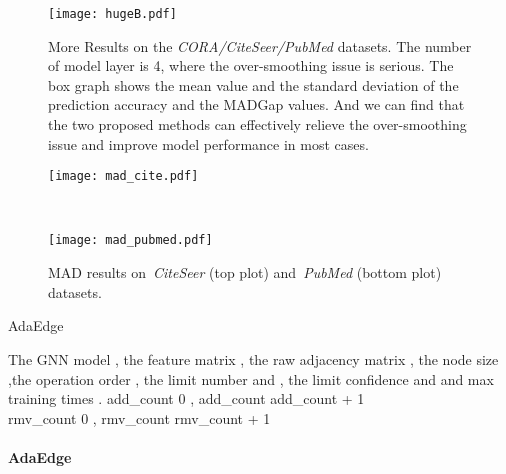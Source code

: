 \documentclass[letterpaper]{article} \usepackage{aaai20}  \usepackage{times}  \usepackage{helvet} \usepackage{courier}  \usepackage[hyphens]{url}  \usepackage{graphicx} \urlstyle{rm} \def\UrlFont{\rm}  \frenchspacing  \setlength{\pdfpagewidth}{8.5in}  \setlength{\pdfpageheight}{11in}  \setcounter{secnumdepth}{0}
\begin{document}
\begin{figure*}[!t]
\centering
\texttt{[image: hugeB.pdf]}
\caption{More Results on the \textit{CORA/CiteSeer/PubMed} datasets. The number of model layer is 4, where the over-smoothing issue is serious. The box graph shows the mean value and the standard deviation of the prediction accuracy and the MADGap values. And we can find that the two proposed methods can effectively relieve the over-smoothing issue and improve model performance in most cases.}
\label{figure_box2}
\end{figure*}

\begin{figure}[t]
\centering
\small
\begin{minipage}{.48\textwidth}
  \centering
  \texttt{[image: mad\_cite.pdf]}
\end{minipage}\\
\begin{minipage}{.48\textwidth}
  \centering
  \texttt{[image: mad\_pubmed.pdf]}
\end{minipage}\caption{MAD results on~\textit{CiteSeer} (top plot) and~\textit{PubMed} (bottom plot) datasets.}
\label{figure_mergeA}
\end{figure}

\begin{algorithm}[t]
\centering
\footnotesize
\begin{algorithmic}[1]
\caption{AdaEdge}\label{loop_training}
\Require
The GNN model , the feature matrix , the raw adjacency matrix , the node size ,the operation order , the limit number  and , the limit confidence  and  and max training times .
    \State add\_count  0 
    \State 
    \State , 
    \State add\_count  add\_count + 1 
     \State  \EndIf
    \EndIf
    \EndFor
    \EndFor
    \State 
\EndFunction \\
    \State rmv\_count  0 
    \State 
    \State , 
    \State rmv\_count  rmv\_count + 1 
     \State  \EndIf
    \EndIf
    \EndFor
    \State 
\EndFunction \\
\State 
\State 
\Else
\State 
\State 
\EndIf
\State 
\EndFunction \\

\State \textbf{AdaEdge}
\State 
\State 
{}
\State 
\If{}
\State 
\EndIf
\State 
\EndFor
\State 
\end{algorithmic}
\end{algorithm}
\end{document}
